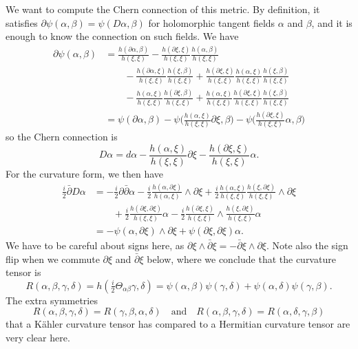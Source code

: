 \documentclass[10pt,a4paper]{article}
\begin{document}
We want to compute the Chern connection of this metric. By definition, it satisfies $\partial \psi(\alpha,\beta) = \psi(D\alpha,\beta)$ for holomorphic tangent fields $\alpha$ and $\beta$, and it is enough to know the connection on such fields. We have
\begin{align*}
\partial \psi(\alpha,\beta)
&= \frac{h(\partial\alpha, \beta)}{h(\xi,\xi)}
- \frac{h(\partial\xi, \xi)}{h(\xi,\xi)}
 \frac{h(\alpha,\beta)}{h(\xi,\xi)}
\\
&\qquad{}
- \frac{h(\partial\alpha,\xi)}{h(\xi,\xi)}
\frac{h(\xi,\beta)}{h(\xi,\xi)}
+ \frac{h(\partial\xi,\xi)}{h(\xi,\xi)}
\frac{h(\alpha,\xi)}{h(\xi,\xi)}
\frac{h(\xi,\beta)}{h(\xi,\xi)}
\\
&\qquad{}
- \frac{h(\alpha,\xi)}{h(\xi,\xi)} \frac{h(\partial\xi,\beta)}{h(\xi,\xi)}
+\frac{h(\alpha, \xi)}{h(\xi,\xi)}
\frac{h(\partial\xi,\xi)}{h(\xi,\xi)}
\frac{h(\xi,\beta)}{h(\xi,\xi)}
\\
&= \psi(\partial\alpha,\beta)
- \psi\biggl(\frac{h(\alpha,\xi)}{h(\xi,\xi)} \partial\xi, \beta \biggr)
- \psi\biggl(\frac{h(\partial\xi,\xi)}{h(\xi,\xi)} \alpha, \beta \biggr)
\end{align*}
so the Chern connection is
$$
 D \alpha
= d\alpha
- \frac{h(\alpha,\xi)}{h(\xi,\xi)} \partial\xi
- \frac{h(\partial\xi,\xi)}{h(\xi,\xi)} \alpha.
$$
For the curvature form, we then have
\begin{align*}
\frac i2\bar\partial D\alpha
&= -\frac i2 \partial\bar\partial \alpha
- \frac i2 \frac{h(\alpha,\partial\xi)}{h(\alpha,\xi)} \wedge \partial \xi
+ \frac i2 \frac{h(\alpha,\xi)}{h(\xi,\xi)} \frac{h(\xi,\partial\xi)}{h(\xi,\xi)} \wedge \partial\xi
\\
&\qquad{}
+ \frac i2\frac{h(\partial\xi,\partial\xi)}{h(\xi,\xi)} \alpha
- \frac i2\frac{h(\partial\xi,\xi)}{h(\xi,\xi)} \wedge \frac{h(\xi,\partial\xi)}{h(\xi,\xi)} \alpha
\\
&= - \psi(\alpha, \partial\xi) \wedge \partial \xi
+ \psi(\partial\xi, \partial\xi) \alpha.
\end{align*}
We have to be careful about signs here, as $\partial \xi \wedge \bar\partial \xi = - \bar\partial \xi \wedge \partial \xi$. Note also the sign flip when we commute $\partial\xi$ and $\bar\partial\xi$ below, where we conclude that the curvature tensor is
$$
R(\alpha,\beta,\gamma,\delta)
= h(\tfrac i2\Theta_{\alpha \beta} \gamma, \delta)
= \psi(\alpha, \beta) \psi(\gamma, \delta)
+ \psi(\alpha, \delta) \psi(\gamma, \beta).
$$
The extra symmetries
$$
R(\alpha,\beta,\gamma,\delta) = R(\gamma,\beta,\alpha,\delta)
\quad\text{and}\quad
R(\alpha,\beta,\gamma,\delta) = R(\alpha,\delta,\gamma,\beta)
$$
that a K\"ahler curvature tensor has compared to a Hermitian curvature tensor are very clear here.
\end{document}
